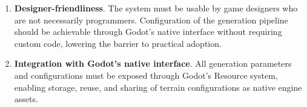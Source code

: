 \begin{enumerate}
    A dedicated framework must be developed to measure the computational performance of each stage of the generation pipeline.
    This allows for informed optimization decisions and provides a quantitative basis for evaluating the system's performance.
    \item \textbf{Designer-friendliness}.
    The system must be usable by game designers who are not necessarily programmers.
    Configuration of the generation pipeline should be achievable through Godot's native interface without requiring custom code, lowering the barrier to practical adoption.
    \item \textbf{Integration with Godot's native interface}.
    All generation parameters and configurations must be exposed through Godot's Resource system, enabling storage, reuse, and sharing of terrain configurations as native engine assets.

    
\end{enumerate}

